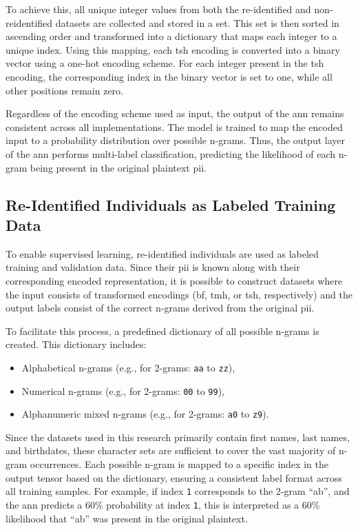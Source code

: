 To achieve this, all unique integer values from both the re-identified and non-reidentified datasets are collected and stored in a set.
This set is then sorted in ascending order and transformed into a dictionary that maps each integer to a unique index.
Using this mapping, each \ac{tsh} encoding is converted into a binary vector using a one-hot encoding scheme.
For each integer present in the \ac{tsh} encoding, the corresponding index in the binary vector is set to one, while all other positions remain zero.

Regardless of the encoding scheme used as input, the output of the \ac{ann} remains consistent across all implementations.
The model is trained to map the encoded input to a probability distribution over possible n-grams.
Thus, the output layer of the \ac{ann} performs multi-label classification, predicting the likelihood of each n-gram being present in the original plaintext \ac{pii}.

\subsection{Re-Identified Individuals as Labeled Training Data}

To enable supervised learning, re-identified individuals are used as labeled training and validation data.
Since their \ac{pii} is known along with their corresponding encoded representation, it is possible to construct datasets where the input consists of transformed encodings (\ac{bf}, \ac{tmh}, or \ac{tsh}, respectively) and the output labels consist of the correct n-grams derived from the original \ac{pii}.

To facilitate this process, a predefined dictionary of all possible n-grams is created. This dictionary includes:
\begin{itemize}
   \item Alphabetical n-grams (e.g., for 2-grams: \texttt{aa} to \texttt{zz}),
   \item Numerical n-grams (e.g., for 2-grams: \texttt{00} to \texttt{99}),
   \item Alphanumeric mixed n-grams (e.g., for 2-grams: \texttt{a0} to \texttt{z9}).
\end{itemize}

Since the datasets used in this research primarily contain first names, last names, and birthdates, these character sets are sufficient to cover the vast majority of n-gram occurrences.
Each possible n-gram is mapped to a specific index in the output tensor based on the dictionary, ensuring a consistent label format across all training samples.
For example, if index \texttt{1} corresponds to the 2-gram \enquote{ab}, and the \ac{ann} predicts a 60\% probability at index \texttt{1}, this is interpreted as a 60\% likelihood that \enquote{ab} was present in the original plaintext.

